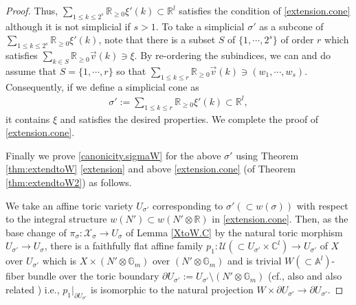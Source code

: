 \documentclass[12pt,a4paper]{amsart}
\theoremstyle{remark}
\theoremstyle{definition}
\def\R{\mathbb{R}}
\def\C{\mathbb{C}}
\def\G{\mathbb{G}}
\def\A{\mathbb{A}}
\begin{document}
\begin{proof}
Thus, $\sum_{1\le k\le 2^s} \R_{\ge 0}\xi'(k)\subset \R^l$ satisfies 
the condition of \eqref{extension.cone} although it is not simplicial 
if $s>1$. 
To take a simplicial $\sigma'$ as a subcone of 
$\sum_{1\le k\le 2^s} \R_{\ge 0}\xi'(k)$, note that 
there is a subset $S$ of $\{1,\cdots,2^s\}$ of order $r$ 
which satisfies 
$\sum_{k\in S} \R_{\ge 0}\vec{v}(k)\ni \xi$. 
By re-ordering the subindices, we can and do assume that 
$S=\{1,\cdots,r\}$ so that 
$\sum_{1\le k\le r} \R_{\ge 0}\vec{v}(k)\ni (w_1,\cdots,w_s).$ 
Consequently, if we define a simplicial cone as 
\begin{align}\label{sigma'}
\sigma':=\underset{1\le k\le r}\sum \R_{\ge 0}\xi'(k)\subset \R^l, 
\end{align}
it contains $\xi$ and satisfies the desired properties. 
We complete the proof of \eqref{extension.cone}. 
\vspace{2mm}

 Finally we prove \eqref{canonicity.sigmaW} for 
the above $\sigma'$ 
using Theorem \ref{thm:extendtoW} \eqref{extension} and above  \eqref{extension.cone} (of Theorem \ref{thm:extendtoW2}) as follows. 
 
 We take an affine toric variety $U_{\sigma'}$ 
 corresponding to $\sigma'(\subset w(\sigma))$ 
 with respect to the integral structure $w(N')\subset w(N'\otimes \R)$ 
 in \eqref{extension.cone}. 
 Then, 
 as the base change of $\pi_\sigma\colon 
 \mathcal{X}_\sigma\to U_\sigma$ 
 of Lemma \ref{XtoW.C} 
 by the natural toric morphism $U_{\sigma'}\to U_\sigma$, 
 there is a faithfully flat affine family 
 $p_1\colon \mathcal{U}(\subset U_{\sigma'}\times\C^l)\to U_{\sigma'}$ of $X$ over $U_{\sigma'}$ 
 which is $X\times (N'\otimes \G_m)$ over $(N'\otimes \G_m)$ and 
 is trivial $W(\subset \A^l)$-fiber bundle  
 over the toric boundary $\partial U_{\sigma'}:=U_{\sigma'}\setminus (N'\otimes \G_m)$ 
 (cf., also \cite[\S 2, Example 2.9]{Od24b} and also related 
 \cite[\S 2.2]{Od24c}) i.e., $p_1|_{\partial U_{\sigma'}}$ is isomorphic to 
 the natural projection $W\times \partial  U_{\sigma'}\to \partial U_{\sigma'}.$


\end{proof}
\end{document}
